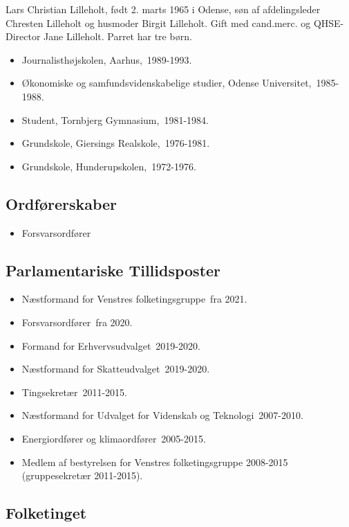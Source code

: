 \documentclass[11pt, a4paper]{awesome-cv}
\begin{document}
\makecvheader[R]
\makelettertitle
\begin{cvletter}
Lars Christian Lilleholt, født 2. marts 1965 i Odense, søn af afdelingsleder Chresten Lilleholt og husmoder Birgit Lilleholt. Gift med cand.merc. og QHSE-Director Jane Lilleholt. Parret har tre børn.

\begin{itemize}
\item Journalisthøjskolen, Aarhus, 1989-1993.
\item Økonomiske og samfundsvidenskabelige studier, Odense Universitet, 1985-1988.
\item Student, Tornbjerg Gymnasium, 1981-1984.
\item Grundskole, Giersings Realskole, 1976-1981.
\item Grundskole, Hunderupskolen, 1972-1976.
\end{itemize}
\subsection*{Ordførerskaber}
\begin{itemize}
\item Forsvarsordfører
\end{itemize}
\subsection*{Parlamentariske Tillidsposter}
\begin{itemize}
\item Næstformand for Venstres folketingsgruppe fra 2021.
\item Forsvarsordfører fra 2020.
\item Formand for Erhvervsudvalget 2019-2020.
\item Næstformand for Skatteudvalget 2019-2020.
\item Tingsekretær 2011-2015.
\item Næstformand for Udvalget for Videnskab og Teknologi 2007-2010.
\item Energiordfører og klimaordfører 2005-2015.
\item Medlem af bestyrelsen for Venstres folketingsgruppe 2008-2015 (gruppesekretær 2011-2015).
\end{itemize}
\subsection*{Folketinget}

\end{cvletter}
\end{document}
